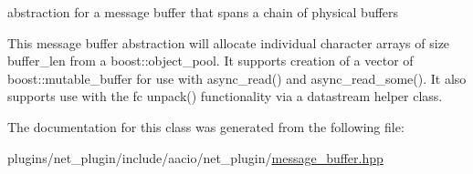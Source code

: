 abstraction for a message buffer that spans a chain of physical buffers 

This message buffer abstraction will allocate individual character arrays of size buffer\+\_\+len from a boost\+::object\+\_\+pool. It supports creation of a vector of boost\+::mutable\+\_\+buffer for use with async\+\_\+read() and async\+\_\+read\+\_\+some(). It also supports use with the fc unpack() functionality via a datastream helper class. 

The documentation for this class was generated from the following file\+:\begin{DoxyCompactItemize}
\item 
plugins/net\+\_\+plugin/include/aacio/net\+\_\+plugin/\mbox{\hyperlink{message__buffer_8hpp}{message\+\_\+buffer.\+hpp}}\end{DoxyCompactItemize}
